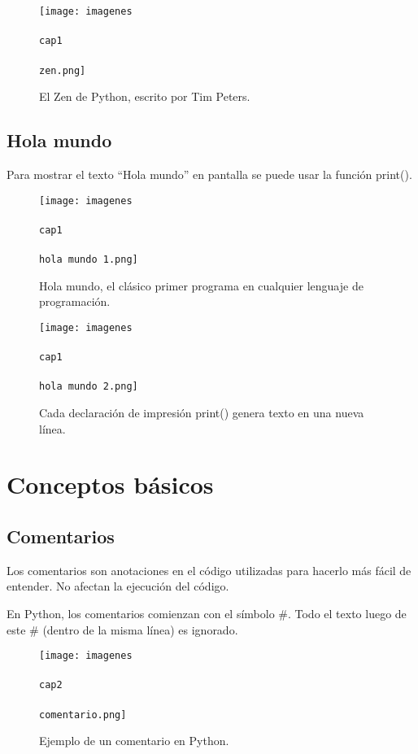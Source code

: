 \documentclass{article}
\newcommand{\doble}[1]{``#1''}
\begin{document}
      \begin{figure}[ht!]
        \texttt{[image: imagenes\\\\cap1\\\\zen.png]}
        \caption{El Zen de Python, escrito por Tim Peters.}
      \end{figure}


    \subsection{Hola mundo}

      Para mostrar el texto \doble{Hola mundo} en pantalla se puede usar la función print().

      \begin{figure}[ht!]
        \texttt{[image: imagenes\\\\cap1\\\\hola mundo 1.png]}
        \caption{Hola mundo, el clásico primer programa en cualquier lenguaje de programación.}
      \end{figure}

      \begin{figure}[ht!]
        \texttt{[image: imagenes\\\\cap1\\\\hola mundo 2.png]}
        \caption{Cada declaración de impresión print() genera texto en una nueva línea.}
      \end{figure}

  \newpage
  \section{Conceptos básicos}

    \subsection{Comentarios}

      Los comentarios son anotaciones en el código utilizadas para hacerlo más fácil de entender. No afectan la ejecución del código.

      En Python, los comentarios comienzan con el símbolo \#. Todo el texto luego de este \# (dentro de la misma línea) es ignorado.

      \begin{figure}[ht!]
        \texttt{[image: imagenes\\\\cap2\\\\comentario.png]}
        \caption{Ejemplo de un comentario en Python.}
      \end{figure}
\end{document}
